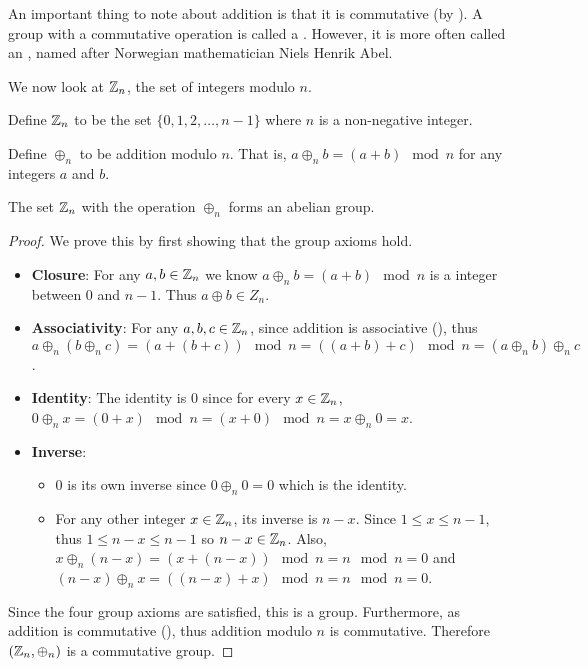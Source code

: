 An important thing to note about addition is that it is commutative (by ). A group with a commutative operation is called a . However, it is more often called an , named after Norwegian mathematician Niels Henrik Abel.

We now look at $\mathbb{Z}_n$, the set of integers modulo $n$.
\begin{definition}
    Define $\mathbb{Z}_n$ to be the set $\{0, 1, 2, \dots, n-1\}$ where $n$ is a non-negative integer.
\end{definition}
\begin{definition}
    Define $\oplus_n$ to be addition modulo $n$. That is, $a \oplus_n b = (a + b) \mod{n}$ for any integers $a$ and $b$.
\end{definition}
\begin{proposition}\label{prop-Zn-is-abelian-group}
    The set $\mathbb{Z}_n$ with the operation $\oplus_n$ forms an abelian group.
\end{proposition}
\begin{proof}
    We prove this by first showing that the group axioms hold.
    \begin{itemize}
        \item \textbf{Closure}: For any $a, b \in \mathbb{Z}_n$ we know $a \oplus_n b = (a + b) \mod{n}$ is a integer between 0 and $n - 1$. Thus $a \oplus b \in Z_n$.
        \item \textbf{Associativity}: For any $a, b, c \in \mathbb{Z}_n$, since addition is associative (), thus $a \oplus_n (b \oplus_n c) = (a + (b + c)) \mod{n} = ((a + b) + c) \mod{n} = (a \oplus_n b) \oplus_n c$.
        \item \textbf{Identity}: The identity is $0$ since for every $x \in \mathbb{Z}_n$, $0 \oplus_n x = (0 + x) \mod{n} = (x + 0) \mod{n} = x \oplus_n 0 = x$.
        \item \textbf{Inverse}:
        \begin{itemize}
            \item $0$ is its own inverse since $0 \oplus_n 0 = 0$ which is the identity.
            \item For any other integer $x \in \mathbb{Z}_n$, its inverse is $n - x$. Since $1 \leq x \leq n - 1$, thus $1 \leq n - x \leq n - 1$ so $n - x \in \mathbb{Z}_n$. Also, $x \oplus_n (n - x) = (x + (n - x)) \mod{n} = n \mod{n} = 0$ and $(n - x) \oplus_n x = ((n-x) + x)\mod{n} = n \mod{n} = 0$.
        \end{itemize}
    \end{itemize}
    Since the four group axioms are satisfied, this is a group. Furthermore, as addition is commutative (), thus addition modulo $n$ is commutative. Therefore $(\mathbb{Z}_n, \oplus_n)$ is a commutative group.
\end{proof}

